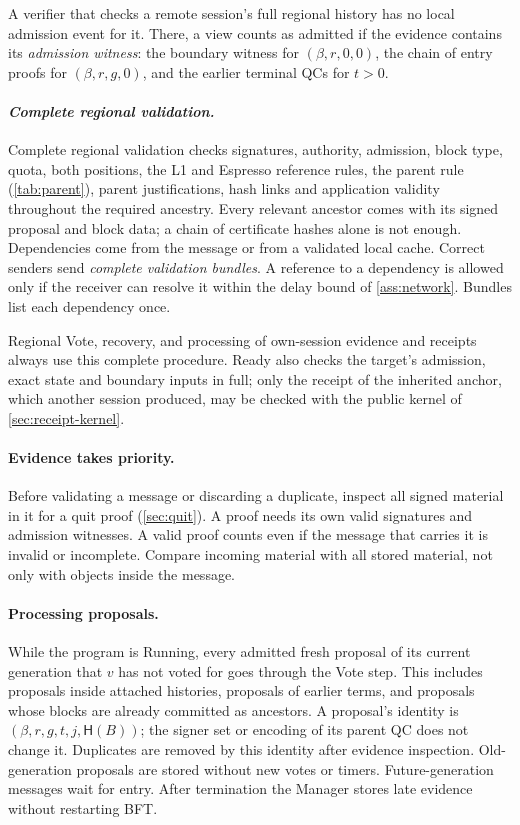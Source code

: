 \documentclass[11pt,a4paper]{article}
\newcommand{\Hash}{\mathsf H}
\newcommand{\defterm}[1]{\textcolor{rrBlue}{\textit{#1}}}
\begin{document}
A verifier that checks a remote session's full regional history has no
local admission event for it. There, a view counts as admitted if the
evidence contains its \defterm{admission witness}: the boundary witness
for $(\beta,r,0,0)$, the chain of entry proofs for $(\beta,r,g,0)$, and
the earlier terminal QCs for $t>0$.

\paragraph{\defterm{Complete regional validation.}}
Complete regional validation checks signatures, authority, admission,
block type, quota, both positions, the L1 and Espresso reference rules,
the parent rule (\cref{tab:parent}), parent justifications, hash links and
application validity throughout the required ancestry. Every relevant
ancestor comes with its signed proposal and block data; a chain of
certificate hashes alone is not enough. Dependencies come from the
message or from a validated local cache. Correct senders send
\defterm{complete validation bundles}. A reference to a dependency is
allowed only if the receiver can resolve it within the delay bound of
\cref{ass:network}. Bundles list each dependency once.

Regional Vote, recovery, and processing of own-session evidence and
receipts always use this complete procedure. Ready also checks the
target's admission, exact state and boundary inputs in full; only the
receipt of the inherited anchor, which another session produced, may be
checked with the public kernel of \cref{sec:receipt-kernel}.

\paragraph{Evidence takes priority.}
Before validating a message or discarding a duplicate, inspect all signed
material in it for a quit proof (\cref{sec:quit}). A proof needs its own
valid signatures and admission witnesses. A valid proof counts even if
the message that carries it is invalid or incomplete. Compare incoming
material with all stored material, not only with objects inside the
message.

\paragraph{Processing proposals.}
While the program is Running, every admitted fresh proposal of its
current generation that $v$ has not voted for goes through the Vote step.
This includes proposals inside attached histories, proposals
of earlier terms, and proposals whose blocks are already committed as
ancestors. A proposal's identity is $(\beta,r,g,t,j,\Hash(B))$; the signer
set or encoding of its parent QC does not change it. Duplicates are
removed by this identity after evidence inspection. Old-generation
proposals are stored without new votes or timers. Future-generation
messages wait for entry. After termination the Manager stores late
evidence without restarting BFT.
\end{document}
